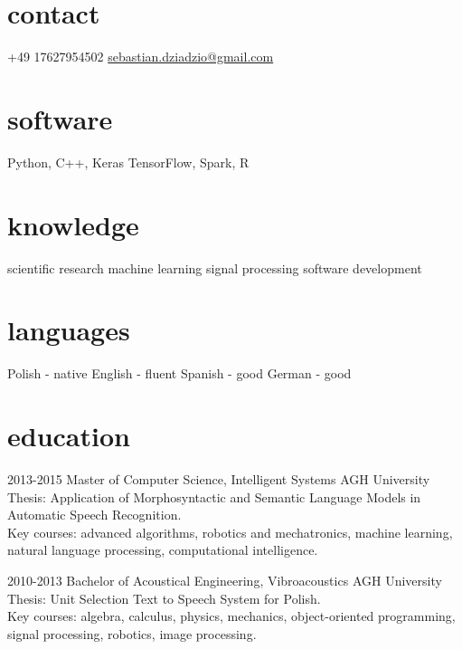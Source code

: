 \documentclass[]{friggeri-cv_osx}
\begin{document}


\begin{aside}
\section{contact}
\href{http:sebastiandziadzio.com}{\color{gray} \faHome} \href{https://github.com/sebastiandziadzio}{\color{gray} \faGithub} \href{https://twitter.com/sebadzia}{\color{gray} \faTwitter} \href{http://pl.linkedin.com/in/sebastiandziadzio}{\color{gray} \faLinkedin} 
+49 17627954502
\href{mailto:sebastian.dziadzio@gmail.com}{sebastian.dziadzio@gmail.com}
\section{software}
Python, C++, Keras
TensorFlow, Spark, R
\section{knowledge}
scientific research
machine learning
signal processing
software development
\section{languages}
Polish - native
English - fluent
Spanish - good
German - good
\end{aside}


\section{education}
\begin{entrylist}
\entry
{2013-2015}
{Master of Computer Science, Intelligent Systems}
{AGH University}
{Thesis: Application of Morphosyntactic and Semantic Language Models in Automatic Speech Recognition.\\
Key courses: advanced algorithms, robotics and mechatronics, machine learning, natural language processing, computational intelligence.\\}

\entry
{2010-2013}
{Bachelor of Acoustical Engineering, Vibroacoustics}
{AGH University}
{Thesis: Unit Selection Text to Speech System for Polish.\\
Key courses: algebra, calculus, physics, mechanics, object-oriented programming, signal processing, robotics, image processing.\\}
\end{entrylist}
\end{document}
